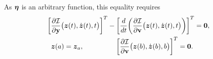 \documentclass[3p,computermodern,10pt]{elsarticle}
\begin{document}
\begin{appendices}
As $\boldsymbol \eta$ is an arbitrary function, this equality requires
\begin{equation}\label{eq:euler_lagrange_appendix}
\begin{split}
\bigg[ &\frac{\partial \mathcal{I}  }{\partial \mathbf{y} }
	\big(\boldsymbol z(t),\dot{\boldsymbol z}(t) ,t\big) \bigg]^T - \bigg[ \frac{d}{dt}\bigg(
	\frac{\partial \mathcal{I}}{\partial \mathbf{{v}} }
	\big(\boldsymbol z(t),\dot{\boldsymbol z}(t),t \big) \bigg) \bigg]^T = \boldsymbol 0 , \\
&\boldsymbol z(a) = \boldsymbol z_a, \hspace{0.65 in} \bigg[ \frac{\partial \mathcal{I}}{\partial \mathbf{{v}}} \big(\boldsymbol z(b),\dot{\boldsymbol z}(b),b \big) \bigg]^T = \boldsymbol 0.
\end{split}
\end{equation}

\end{appendices}
\end{document}
